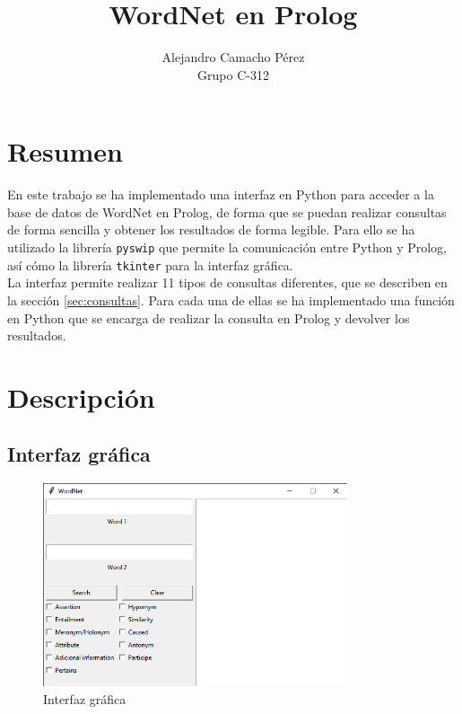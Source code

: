 \documentclass[12pt]{article}
\title{WordNet en Prolog}
\author{Alejandro Camacho Pérez\\Grupo C-312}
\date{}
\begin{document}
\maketitle
\tableofcontents

\section{Resumen}

En este trabajo se ha implementado una interfaz en Python para acceder a la base de datos de WordNet en Prolog, de forma que se puedan realizar consultas de forma sencilla y obtener los resultados de forma legible. Para ello se ha utilizado la librería \texttt{pyswip} que permite la comunicación entre Python y Prolog, así cómo la librería \texttt{tkinter} para la interfaz gráfica. \\

La interfaz permite realizar 11 tipos de consultas diferentes, que se describen en la sección \ref{sec:consultas}. Para cada una de ellas se ha implementado una función en Python que se encarga de realizar la consulta en Prolog y devolver los resultados.

\newpage

\section{Descripción}

\subsection{Interfaz gráfica}


\begin{figure}[h]
    \centering
    \includegraphics[width=0.8\textwidth]{ui.png}
    \caption{Interfaz gráfica}
    \label{fig:ui}
\end{figure}
\end{document}
